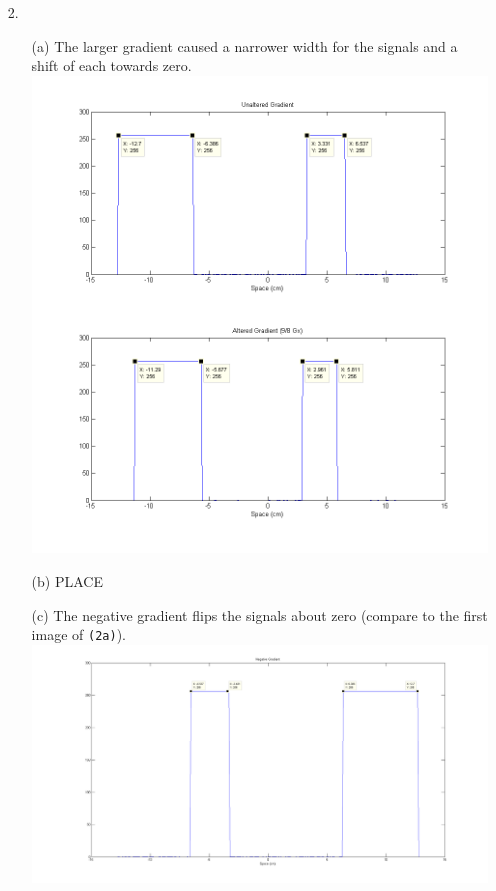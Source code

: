 \documentclass{article}
\begin{document}
\begin{enumerate}
\item[2.]
	\begin{enumerate}
	\item[(a)]
		The larger gradient caused a narrower width for the signals and a shift of each towards zero.\\
		\includegraphics[width=\textwidth]{../images/AlteredGradient} \\
	\item[(b)]
		PLACE
\newpage
	\item[(c)]
		The negative gradient flips the signals about zero (compare to the first image of \texttt{(2a)}).\\
		\includegraphics[width=\linewidth]{../images/Negativegradient} \\
	\end{enumerate}

\end{enumerate}
\end{document}
